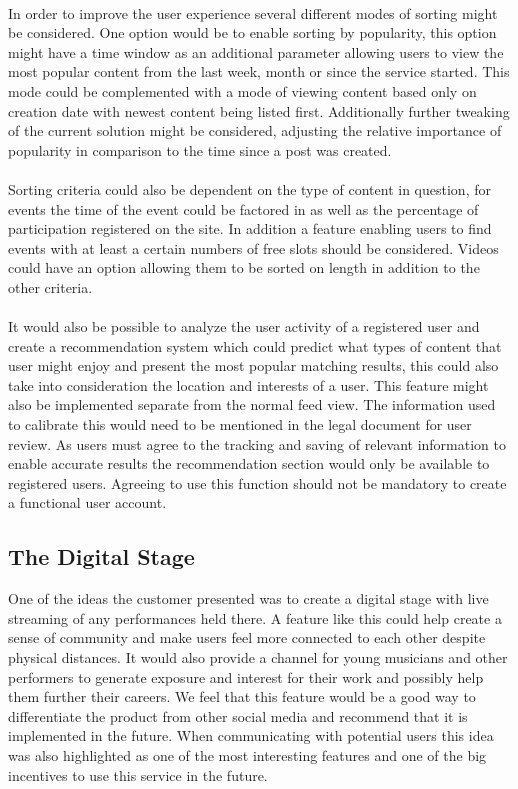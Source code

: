 \paragraph{} In order to improve the user experience several different modes of sorting might be considered. One option would be to enable sorting by popularity, this option might have a time window as an additional parameter allowing users to view the most popular content from the last week, month or since the service started. This mode could be complemented with a mode of viewing content based only on creation date with newest content being listed first. Additionally further tweaking of the current solution might be considered, adjusting the relative importance of popularity in comparison to the time since a post was created.
\paragraph{} Sorting criteria could also be dependent on the type of content in question, for events the time of the event could be factored in as well as the percentage of participation registered on the site. In addition a feature enabling users to find events with at least a certain numbers of free slots should be considered. Videos could have an option allowing them to be sorted on length in addition to the other criteria.
\paragraph{} It would also be possible to analyze the user activity of a registered user and create a recommendation system which could predict what types of  content that user might enjoy and present the most popular matching results, this could also take into consideration the location and interests of a user. This feature might also be implemented separate from the normal feed view. The information used to calibrate this would need to be mentioned in the legal document for user review. As users must agree to the tracking and saving of relevant information to enable accurate results the recommendation section would only be available to registered users. Agreeing to use this function should not be mandatory to create a functional user account.

\subsection{The Digital Stage} One of the ideas the customer presented was to create a digital stage with live streaming of any performances held there. A feature like this could help create a sense of community and make users feel more connected to each other despite physical distances. It would also provide a channel for young musicians and other performers to generate exposure and interest for their work and possibly help them further their careers. We feel that this feature would be a good way to differentiate the product from other social media and recommend that it is implemented in the future. When communicating with potential users this idea was also highlighted as one of the most interesting features and one of the big incentives to use this service in the future. 
